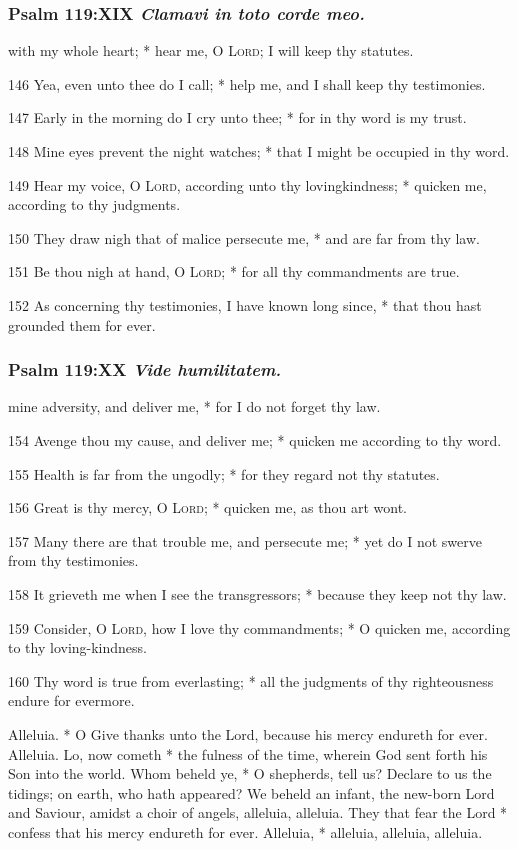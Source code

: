 \subsubsection{Psalm 119:XIX \textit{Clamavi in toto corde meo.}}
 with my whole heart; * hear me, O \textsc{Lord}; I will keep thy statutes.
\par
    146 Yea, even unto thee do I call; * help me, and I shall keep thy testimonies.
\par
    147 Early in the morning do I cry unto thee; * for in thy word is my trust.
\par
    148 Mine eyes prevent the night watches; * that I might be occupied in thy word.
\par
    149 Hear my voice, O \textsc{Lord}, according unto thy lovingkindness; * quicken me, according to thy judgments.
\par
    150 They draw nigh that of malice persecute me, * and are far from thy law.
\par
    151 Be thou nigh at hand, O \textsc{Lord}; * for all thy commandments are true.
\par
    152 As concerning thy testimonies, I have known long since, * that thou hast grounded them for ever.
\subsubsection{Psalm 119:XX \textit{Vide humilitatem.}}
 mine adversity, and deliver me, * for I do not forget thy law.
\par
    154 Avenge thou my cause, and deliver me; * quicken me according to thy word.
\par
    155 Health is far from the ungodly; * for they regard not thy statutes.
\par
    156 Great is thy mercy, O \textsc{Lord}; * quicken me, as thou art wont.
\par
    157 Many there are that trouble me, and persecute me; * yet do I not swerve from thy testimonies.
\par
    158 It grieveth me when I see the transgressors; * because they keep not thy law.
\par
    159 Consider, O \textsc{Lord}, how I love thy commandments; * O quicken me, according to thy loving-kindness.
\par
    160 Thy word is true from everlasting; * all the judgments of thy righteousness endure for evermore.
\par\noindent
{} Alleluia. * O Give thanks unto the Lord, because his mercy endureth for ever. Alleluia.
 Lo, now cometh * the fulness of the time, wherein God sent forth his Son into the world.
 Whom beheld ye, * O shepherds, tell us? Declare to us the tidings; on earth, who hath appeared? We beheld an infant, the new-born Lord and Saviour, amidst a choir of angels, alleluia, alleluia.
 They that fear the Lord * confess that his mercy endureth for ever.
 Alleluia, * alleluia, alleluia, alleluia.
